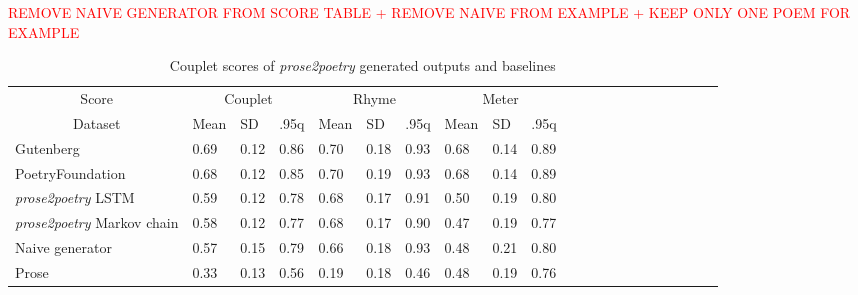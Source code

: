 \documentclass[11pt,a4paper]{article}
\begin{document}
\textcolor{red}{
REMOVE NAIVE GENERATOR FROM SCORE TABLE + REMOVE NAIVE FROM EXAMPLE + KEEP ONLY ONE POEM FOR EXAMPLE
}
\begin{table}[ht]
\begin{tabular}{|l|l|l|l|l|l|l|l|l|l|l|c|c|c|c|c|c|c|c|c|c|}
\hline\hline
\multicolumn{1}{|c|}{Score} & \multicolumn{3}{c|}{Couplet} & \multicolumn{3}{c|}{Rhyme} & \multicolumn{3}{c|}{Meter}\\
\cline{1-10}
\multicolumn{1}{|c|}{Dataset} & Mean & SD & .95q & Mean & SD & .95q & Mean & SD & .95q \\
\hline\hline
Gutenberg & 0.69 & 0.12 & 0.86 & 0.70 & 0.18 & 0.93 & 0.68 & 0.14 & 0.89 \\ [0.5ex]
\hline
PoetryFoundation & 0.68 & 0.12 & 0.85 & 0.70 & 0.19 & 0.93 & 0.68 & 0.14 & 0.89 \\ [0.5ex]
\hline
\textit{prose2poetry} LSTM & 0.59 & 0.12 & 0.78 & 0.68 & 0.17 & 0.91 & 0.50 & 0.19 & 0.80 \\ [0.5ex]
\hline
\textit{prose2poetry} Markov chain & 0.58 & 0.12 & 0.77 & 0.68 & 0.17 & 0.90 & 0.47 & 0.19 & 0.77 \\ [0.5ex]
\hline
Naive generator & 0.57 & 0.15 & 0.79 & 0.66 & 0.18 & 0.93 & 0.48 & 0.21 & 0.80 \\ [0.5ex]
\hline
Prose & 0.33 & 0.13 & 0.56 & 0.19 & 0.18 & 0.46 & 0.48 & 0.19 & 0.76 \\ [0.5ex]
\hline
\end{tabular}

\caption{Couplet scores of \textit{prose2poetry} generated outputs and baselines}
\label{table:couplet_results}
\end{table}
\end{document}
